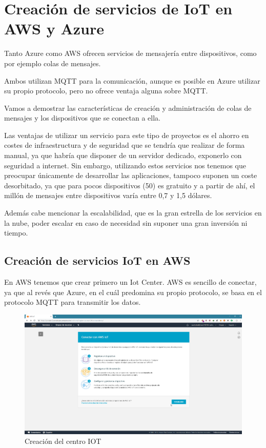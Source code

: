 \chapter{Creación de servicios de IoT en AWS y Azure}
Tanto Azure como AWS ofrecen servicios de mensajería entre dispositivos, como por ejemplo colas de mensajes. 

Ambos utilizan MQTT para la comunicación, aunque es posible en Azure utilizar su propio protocolo, pero no ofrece ventaja alguna sobre MQTT.

Vamos a demostrar las características de creación y administración de colas de mensajes y  los dispositivos que se conectan a ella.

Las ventajas de utilizar un servicio para este tipo de proyectos es el ahorro en costes de infraestructura y de seguridad que se tendría que realizar de forma manual, ya que habría que disponer de un servidor dedicado, exponerlo con seguridad a internet. Sin embargo, utilizando estos servicios nos tenemos que preocupar únicamente de desarrollar las aplicaciones, tampoco suponen un coste desorbitado, ya que para pocos dispositivos (50) es gratuito y a partir de ahí, el millón de mensajes entre dispositivos varía entre 0,7 y 1,5 dólares.

Además cabe mencionar la escalabilidad, que es la gran estrella de los servicios en la nube, poder escalar en caso de necesidad sin suponer una gran inversión ni tiempo.

\newpage
\section{Creación de servicios IoT en AWS}
En AWS tenemos que crear primero un Iot Center. AWS es sencillo de conectar, ya que al revés que Azure, en el cuál predomina su propio protocolo, se basa en el protocolo MQTT para transmitir los datos.
\begin{figure}[h]
	\centering
	\includegraphics[scale=0.27]{iot_aws/creacion1.png}
	\caption{Creación del centro IOT}
	\label{AWSIOT1}
\end{figure}

